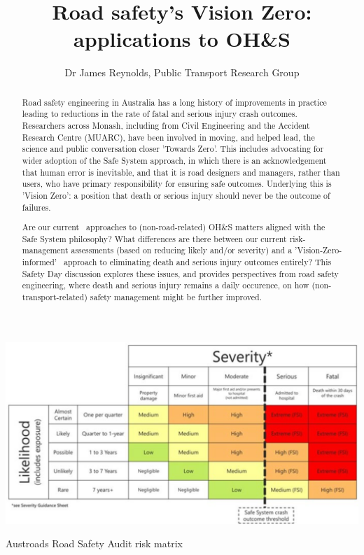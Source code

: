 \documentclass{tufte-handout}
\title{Road safety's Vision Zero: applications to OH\&S}
\author{Dr James Reynolds, Public Transport Research Group}
\begin{document}
\maketitle%

\begin{abstract}
\noindent
Road safety engineering in Australia has a long history of improvements in practice leading to reductions in the rate of fatal and serious injury crash outcomes.  Researchers across Monash, including from Civil Engineering and the Accident Research Centre (MUARC), have been involved in moving, and helped lead, the science and public conversation closer 'Towards Zero'. This includes advocating for wider adoption of the Safe System approach, in which there is an acknowledgement that human error is inevitable, and that it is road designers and managers, rather than users, who have primary responsibility for ensuring safe outcomes. Underlying this is 'Vision Zero': a position that death or serious injury should never be the outcome of failures\cite{Lydon:2017aa}.

Are our current  approaches to (non-road-related) OH\&S matters aligned with the Safe System philosophy? What differences are there between our current risk-management assessments (based on reducing likely and/or severity) and a 'Vision-Zero-informed'  approach to eliminating death and serious injury outcomes entirely? This Safety Day discussion explores these issues, and provides perspectives from road safety engineering, where death and serious injury remains a daily occurence, on how (non-transport-related) safety management might be further improved.\end{abstract}



\begin{marginfigure}
\includegraphics{Austroads_risk_matrix}
\caption{Austroads Road Safety Audit risk matrix}
\label{fig:Austroads_risk_matrix}
\end{marginfigure}
\end{document}
